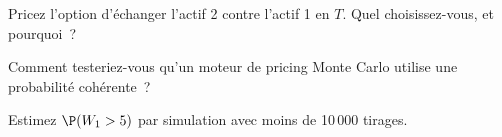 \begin{interviewq}\label{iq:qm:girsanov-and-changes-of-numeraire:4}
Pricez l'option d'échanger l'actif 2 contre l'actif 1 en $T$. Quel  choisissez-vous, et pourquoi~?
\end{interviewq}

\begin{interviewq}\label{iq:qm:girsanov-and-changes-of-numeraire:5}
Comment testeriez-vous qu'un moteur de pricing Monte Carlo utilise une probabilité cohérente~?
\end{interviewq}

\begin{interviewq}\label{iq:qm:girsanov-and-changes-of-numeraire:6}
Estimez $\P(W_1 > 5)$ par simulation avec moins de 10\,000 tirages.
\end{interviewq}
